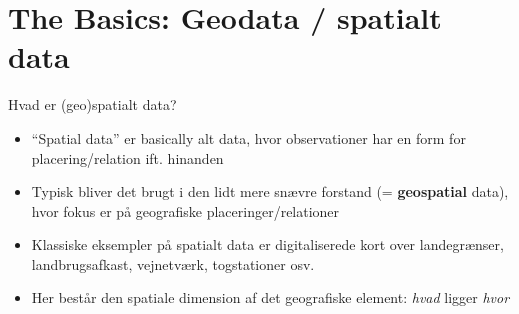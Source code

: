 \documentclass[
  8pt,
  ignorenonframetext,
  aspectratio=169]{beamer}
\begin{document}
\hypertarget{the-basics-geodata-spatialt-data}{%
\section{The Basics: Geodata / spatialt
data}\label{the-basics-geodata-spatialt-data}}

\begin{frame}{Hvad er (geo)spatialt data?}
\protect\hypertarget{hvad-er-geospatialt-data}{}
\tiny

\normalsize

\begin{itemize}
\item
  ``Spatial data'' er basically alt data, hvor observationer har en form
  for placering/relation ift. hinanden
\item
  Typisk bliver det brugt i den lidt mere snævre forstand (=
  \textbf{geospatial} data), hvor fokus er på geografiske
  placeringer/relationer
\item
  Klassiske eksempler på spatialt data er digitaliserede kort over
  landegrænser, landbrugsafkast, vejnetværk, togstationer osv.
\item
  Her består den spatiale dimension af det geografiske element:
  \emph{hvad} ligger \emph{hvor}
\end{itemize}
\end{frame}
\end{document}
